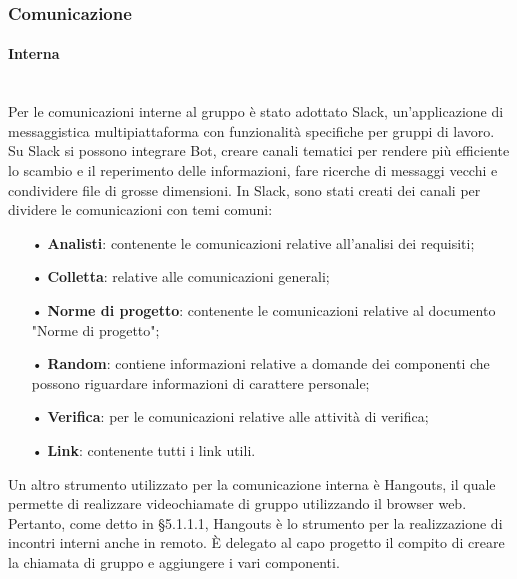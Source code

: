 \subsubsection{Comunicazione}

\paragraph{Interna}\mbox{}\\

Per le comunicazioni interne al gruppo è stato adottato {Slack}, un'applicazione di messaggistica multipiattaforma con funzionalità specifiche per gruppi di lavoro.  
\newline
Su Slack si possono integrare {Bot}, creare canali tematici per rendere più efficiente lo scambio e il reperimento delle informazioni, fare ricerche di messaggi vecchi e condividere file di grosse dimensioni.   
\newline
In Slack, sono stati creati dei canali per dividere le comunicazioni con temi comuni:
\begin{itemize}
\item[•] \textbf{Analisti}: contenente le comunicazioni relative all'analisi dei requisiti;
\item[•] \textbf{Colletta}: relative alle comunicazioni generali;
\item[•] \textbf{Norme di progetto}: contenente le comunicazioni relative al documento "Norme di progetto";
\item[•] \textbf{Random}: contiene informazioni relative a domande dei componenti che possono riguardare informazioni di carattere personale;
\item[•] \textbf{Verifica}: per le comunicazioni relative alle attività di verifica;
\item[•] \textbf{Link}: contenente tutti i link utili.
\end{itemize}
Un altro strumento utilizzato per la comunicazione interna è Hangouts, il quale permette di realizzare videochiamate di gruppo utilizzando il browser web. Pertanto, come detto in §5.1.1.1, Hangouts è lo strumento per la realizzazione di incontri interni anche in remoto. \uppercase{è} delegato al capo progetto il compito di creare la chiamata di gruppo e aggiungere i vari componenti.
